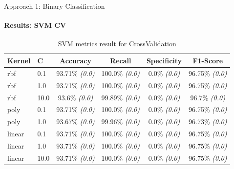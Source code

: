 \documentclass[9pt, pstricks, xcolor=dvipsnames]{beamer}
\begin{document}
\begin{frame}{Approach 1: Binary Classification}
\framesubtitle{Results: SVM CV}
\begin{table}[H]
    \centering
    \begin{tabular}{llcccc}
        \toprule
        Kernel & C & Accuracy & Recall & Specificity & F1-Score  \\
        \midrule
        rbf & 0.1 & 93.71\% \textit{(0.0)} & 100.0\% \textit{(0.0)} & 0.0\% \textit{(0.0)} & 96.75\% \textit{(0.0)} \\
        rbf & 1.0 & 93.71\% \textit{(0.0)} & 100.0\% \textit{(0.0)} & 0.0\% \textit{(0.0)} & 96.75\% \textit{(0.0)} \\
        rbf & 10.0 & 93.6\% \textit{(0.0)} & 99.89\% \textit{(0.0)} & 0.0\% \textit{(0.0)} & 96.7\% \textit{(0.0)} \\
        poly & 0.1 & 93.71\% \textit{(0.0)} & 100.0\% \textit{(0.0)} & 0.0\% \textit{(0.0)} & 96.75\% \textit{(0.0)} \\
        poly & 1.0 & 93.67\% \textit{(0.0)} & 99.96\% \textit{(0.0)} & 0.0\% \textit{(0.0)} & 96.73\% \textit{(0.0)} \\
        linear & 0.1 & 93.71\% \textit{(0.0)} & 100.0\% \textit{(0.0)} & 0.0\% \textit{(0.0)} & 96.75\% \textit{(0.0)} \\
        linear & 1.0 & 93.71\% \textit{(0.0)} & 100.0\% \textit{(0.0)} & 0.0\% \textit{(0.0)} & 96.75\% \textit{(0.0)} \\
        linear & 10.0 & 93.71\% \textit{(0.0)} & 100.0\% \textit{(0.0)} & 0.0\% \textit{(0.0)} & 96.75\% \textit{(0.0)} \\
        \bottomrule
    \end{tabular}
    \caption{SVM metrics result for CrossValidation}
    \label{tab:SVM_CV_approach1}
\end{table}
\end{frame}
\end{document}
